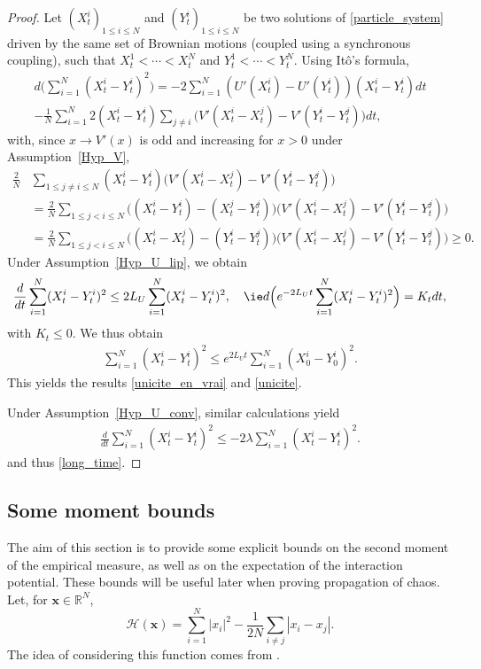 \documentclass[JEP,XML,SOM,Unicode,published]{cedram}
\newcommand{\bx}{{\boldsymbol{x}}}
\theoremstyle{plain}
\theoremstyle{definition}
\begin{document}
\begin{proof}

Let $(X^i_t)_{1\leq i\leq N}$ and $(Y^i_t)_{1\leq i\leq N}$ be two solutions of \eqref{particle_system} driven by the same set of Brownian motions (\ie coupled using a synchronous coupling), such that \hbox{$X^1_t<\cdots<X^N_t$} and $Y^1_t<\cdots<Y^N_t$. Using Itô's formula,
\begin{multline*}
d\biggl(\sum_{i=1}^N(X^i_t-Y^i_t)^2\biggr)=-2\sum_{i=1}^N\left(U'(X^i_t)-U'(Y^i_t)\right)(X^i_t-Y^i_t)dt\\[-5pt]
-\frac{1}{N}\sum_{i=1}^N2(X^i_t-Y^i_t)\sum_{j\neq i}\bigl(V'(X^i_t-X^j_t)-V'(Y^i_t-Y^j_t)\bigr)dt,
\end{multline*}
with, since $x\to V'(x)$ is odd and increasing for $x>0$ under Assumption~\ref{Hyp_V},
\begin{align*}
\frac{2}{N}&\sum_{1\leq j\neq i\leq N}(X^i_t-Y^i_t)\bigl(V'(X^i_t-X^j_t)-V'(Y^i_t-Y^j_t)\bigr)\\
&=\frac{2}{N}\sum_{1\leq j<i\leq N}\bigl((X^i_t-Y^i_t)-(X^j_t-Y^j_t)\bigr)\bigl(V'(X^i_t-X^j_t)-V'(Y^i_t-Y^j_t)\bigr)\\
&=\frac{2}{N}\sum_{1\leq j<i\leq N}\bigl((X^i_t-X^j_t)-(Y^i_t-Y^j_t)\bigr)\bigl(V'(X^i_t-X^j_t)-V'(Y^i_t-Y^j_t)\bigr)\geq0.
\end{align*}
Under Assumption~\ref{Hyp_U_lip}, we obtain
\[
\frac{d}{dt}\sum_{i=1}^N(X^i_t-Y^i_t)^2\leq 2L_U\sum_{i=1}^N (X^i_t-Y^i_t)^2,
\quad\text{\ie}
d \Bigl(e^{-2L_U t}\sum_{i=1}^N(X^i_t-Y^i_t)^2\Bigr)=K_tdt,
\]
with $K_t\leq0$. We thus obtain
\begin{align*}
\sum_{i=1}^N(X^i_t-Y^i_t)^2\leq e^{2L_U t}\sum_{i=1}^N(X^i_0-Y^i_0)^2.
\end{align*}
This yields the results \eqref{unicite_en_vrai} and \eqref{unicite}.

Under Assumption~\ref{Hyp_U_conv}, similar calculations yield
\begin{align*}
\frac{d}{dt}\sum_{i=1}^N(X^i_t-Y^i_t)^2\leq-2\lambda\sum_{i=1}^N (X^i_t-Y^i_t)^2.
\end{align*}
and thus \eqref{long_time}.
\end{proof}

\subsection{Some moment bounds}\label{sec_bornes}

The aim of this section is to provide some explicit bounds on the second moment of the empirical measure, as well as on the expectation of the interaction potential. These bounds will be useful later when proving propagation of chaos. Let, for $\bx\in\mathbb{R}^N$,
\begin{equation}\label{def_H_cal}
\mathcal{H}(\bx)=\sum_{i=1}^N\left|x_i\right|^2-\frac{1}{2N}\sum_{i\neq j}|x_i-x_j|.
\end{equation}
The idea of considering this function comes from \cite{lu_mattingly}.
\end{document}
